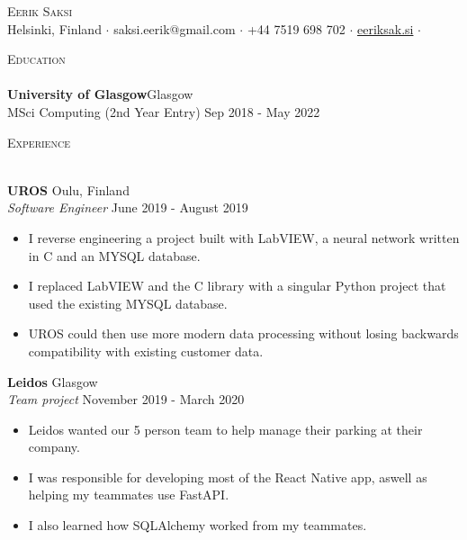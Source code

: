 \documentclass[a4paper]{article}
\newcommand{\lineunder} {
    \vspace*{-8pt} \\
    \hspace*{-18pt} \hrulefill \\
}
\newcommand{\header} [1] {
    {\hspace*{-18pt}\vspace*{6pt} \textsc{#1}}
    \vspace*{-6pt} \lineunder
}
\begin{document}
\vspace*{-40pt}

    

\vspace*{-10pt}
\begin{center}
	{\Huge \scshape {Eerik Saksi}}\\
  Helsinki, Finland $\cdot$ saksi.eerik@gmail.com $\cdot$ +44 7519 698 702 $\cdot$ \url{eeriksak.si} $\cdot$ \\
\end{center}

\header{Education}
\textbf{University of Glasgow}\hfill Glasgow\\
    MSci Computing (2nd Year Entry) \hfill Sep 2018 - May 2022\\
\vspace{2mm}

\header{Experience}
\vspace{1mm}

\textbf{UROS} \hfill Oulu, Finland\\
\textit{Software Engineer} \hfill June 2019 - August 2019\\
\vspace{-1mm}
\begin{itemize} \itemsep 1pt
	\item I reverse engineering a project built with LabVIEW, a neural network written in C and an MYSQL database.
  \item I replaced LabVIEW and the C library with a singular Python project that used the existing MYSQL database.
  \item UROS could then use more modern data processing without losing backwards compatibility with existing customer data.

\end{itemize}
\textbf{Leidos} \hfill Glasgow\\
\textit{Team project} \hfill November 2019 - March 2020\\
\vspace{-1mm}
\begin{itemize} \itemsep 1pt
	\item Leidos wanted our 5 person team to help manage their parking at their company.
  \item I was responsible for developing most of the React Native app, aswell as helping my teammates use FastAPI.
  \item I also learned how SQLAlchemy worked from my teammates.
\end{itemize}
\end{document}
